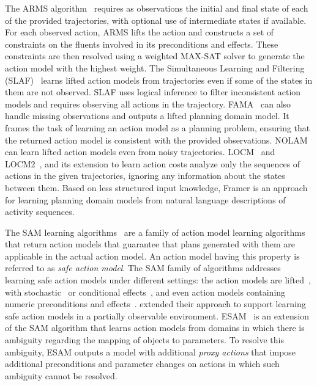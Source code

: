 \documentclass{article}
\theoremstyle{definition}
\theoremstyle{remark}
\newcommand{\sam}{\ac{SAM}\xspace}
\begin{document}
The ARMS algorithm~\citep{yang2007learning} requires as observations the initial and final state of each of the provided trajectories, with optional use of intermediate states if available. For each observed action, ARMS lifts the action and constructs a set of constraints on the fluents involved in its preconditions and effects. These constraints are then resolved using a weighted MAX-SAT solver to generate the action model with the highest weight.
The Simultaneous Learning and Filtering (SLAF)~\citep{amir2008learning} learns lifted action models from trajectories even if some of the states in them are not observed. 
SLAF uses logical inference to filter inconsistent action models and requires observing all actions in the trajectory.  
FAMA~\citep{aineto2019learning} can also handle missing observations and outputs a lifted planning domain model. 
It frames the task of learning an action model as a planning problem, ensuring that the returned action model is consistent with the provided observations.
NOLAM~\citep{Lamanna24} can learn lifted action models even from noisy trajectories. 
LOCM~\citep{cresswell2011generalised} and LOCM2~\citep{cresswell2013acquiring}, and its extension to learn action costs \citep{gregory2016domain} analyze only the sequences of actions in the given trajectories, ignoring any information about the states between them. 
Based on less structured input knowledge, Framer \citep{lindsay2017framer} is an approach for learning planning domain models from natural language descriptions of activity sequences.



The \sam learning algorithms~\citep{stern2017efficient,mordoch2023learning,juba2021safe,juba2022learning,le2024learning,mordoch2024safe} are a family of action model learning algorithms that return action models that guarantee that plans generated with them are applicable in the actual action model. 
An action model having this property is referred to as \emph{safe action model}.
The \sam family of algorithms addresses learning safe action models under different settings: 
the action models are lifted~\citep{juba2021safe}, with stochastic~\citep{juba2022learning} or conditional effects~\citep{mordoch2024safe}, and even action models containing numeric preconditions and effects~\citep{mordoch2023learning}.
\citet{le2024learning} extended their approach to support learning safe action models in a partially observable environment. 
ESAM~\citep{juba2021safe} is an extension of the \sam algorithm that learns action models from domains in which there is ambiguity regarding the mapping of objects to parameters. To resolve this ambiguity, ESAM outputs a model with additional \emph{proxy actions} that impose additional preconditions and parameter changes on actions in which such ambiguity cannot be resolved. 
\end{document}
